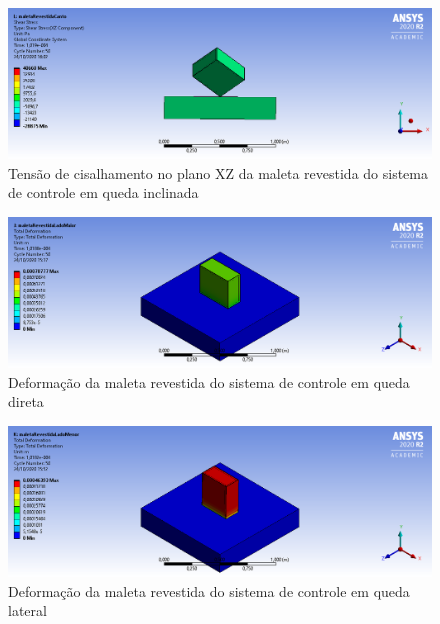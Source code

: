 \begin{apendicesenv}
\begin{figure}[htb]
    \centering
    \includegraphics[width=1.0\textwidth, angle=0]{figuras/estrutura_simulacaoImpacto/maletaRevestidaCisalhamentoXZCanto.png}
    \caption{Tensão de cisalhamento no plano XZ da maleta revestida do sistema de controle em queda inclinada}
    \label{fig:simulacaoImpacto_33}
\end{figure}

\begin{figure}[htb]
    \centering
    \includegraphics[width=1.0\textwidth, angle=0]{figuras/estrutura_simulacaoImpacto/maletaRevestidaDeformationMaior.png}
    \caption{Deformação da maleta revestida do sistema de controle em queda direta}
    \label{fig:simulacaoImpacto_34}
\end{figure}

\begin{figure}[htb]
    \centering
    \includegraphics[width=1.0\textwidth, angle=0]{figuras/estrutura_simulacaoImpacto/maletaRevestidaDeformacaoMenor.png}
    \caption{Deformação da maleta revestida do sistema de controle em queda lateral}
    \label{fig:simulacaoImpacto_35}
\end{figure}


\end{apendicesenv}
